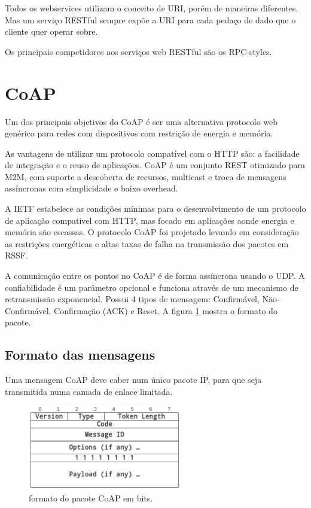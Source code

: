 Todos os webservices utilizam o conceito de URI, por\'em de maneiras diferentes. Mas um servi\c{c}o RESTful sempre exp\~oe a URI para cada peda\c{c}o de dado que o cliente quer operar sobre.

Os principais competidores aos servi\c{c}os web RESTful s\~ao os RPC-styles.

\section{CoAP}

Um dos principais objetivos do CoAP \'e ser uma alternativa protocolo web gen\'erico para redes com dispositivos com restri\c{c}\~ao de energia e mem\'oria.

As vantagens de utilizar um protocolo compat\'ivel com o HTTP s\~ao: a facilidade de integra\c{c}\~ao e o reuso de aplica\c{c}\~oes. CoAP \'e um conjunto REST otimizado para M2M, com suporte a descoberta de recursos, multicast e troca de mensagens ass\'incronas com simplicidade e baixo overhead.

A IETF estabelece as condi\c{c}\~oes m\'inimas para o desenvolvimento de um protocolo de aplica\c{c}\~ao compat\'ivel com HTTP, mas focado em aplica\c{c}\~oes aonde energia e mem\'oria s\~ao escassas. O protocolo CoAP foi projetado levando em considera\c{c}\~ao as restri\c{c}\~oes energ\'eticas e altas taxas de falha na transmiss\~ao dos pacotes em RSSF.

A comunica\c{c}\~ao entre os pontos no CoAP \'e de forma ass\'incrona usando o UDP. A confiabilidade \'e um par\^ametro opcional e funciona atrav\'es de um mecanismo de retransmiss\~ao exponencial. Possui 4 tipos de mensagem: Confirm\'avel, N\~ao-Confirm\'avel, Confirma\c{c}\~ao (ACK) e Reset. A figura \ref{coapFormat} mostra o formato do pacote.

\subsection{Formato das mensagens}
Uma mensagem CoAP deve caber num \'unico pacote IP, para que seja transmitida numa camada de enlace limitada.
\begin{figure}[h]
    \label{coapFormat}
    \centering
    \includegraphics[width=0.6\textwidth]{figuras/formato.png}
    \caption{formato do pacote CoAP  em bits. \cite{draft-ietf-core-coap-18}}
\end{figure}


